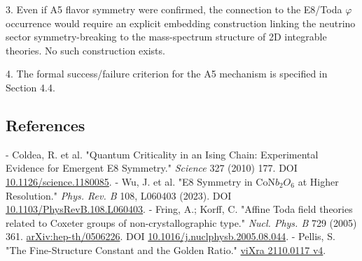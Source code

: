   3. Even if A5 flavor symmetry were confirmed, the connection to the E8/Toda $\varphi$
  occurrence would require an explicit embedding construction linking the neutrino
  sector symmetry-breaking to the mass-spectrum structure of 2D integrable theories. No
  such construction exists.

  4. The formal success/failure criterion for the A5 mechanism is specified in Section 4.4.

\subsection{References}

- Coldea, R. et al. "Quantum Criticality in an Ising Chain: Experimental Evidence for Emergent E8 Symmetry." \textit{Science} 327 (2010) 177. DOI \href{https://doi.org/10.1126/science.1180085}{10.1126/science.1180085}.
- Wu, J. et al. "E8 Symmetry in CoN$b_{2}$$O_{6}$ at Higher Resolution." \textit{Phys. Rev. B} 108, L060403 (2023). DOI \href{https://doi.org/10.1103/PhysRevB.108.L060403}{10.1103/PhysRevB.108.L060403}.
- Fring, A.; Korff, C. "Affine Toda field theories related to Coxeter groups of non-crystallographic type." \textit{Nucl. Phys. B} 729 (2005) 361. \href{https://arxiv.org/abs/hep-th/0506226}{arXiv:hep-th/0506226}. DOI \href{https://doi.org/10.1016/j.nuclphysb.2005.08.044}{10.1016/j.nuclphysb.2005.08.044}.
- Pellis, S. "The Fine-Structure Constant and the Golden Ratio." \href{https://vixra.org/pdf/2110.0117v4.pdf}{viXra 2110.0117 v4}.
